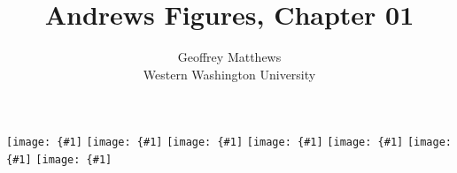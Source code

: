 \documentclass{article}
\title{Andrews Figures, Chapter 01}
\author{Geoffrey Matthews\\
\small Western Washington University}
\newcommand{\myfig}[1]{\hspace{-1.5in}\texttt{[image: \{\#1]}}\newpage}
\newcommand{\myfigbig}[1]
{\hspace{-1.0in}\texttt{[image: \{\#1]}}\newpage}
\begin{document}
\maketitle

\myfig{chap06/6_1.pdf}
\myfigbig{chap06/6_2.pdf}
\myfig{chap06/6_3.pdf}
\myfigbig{chap06/6_4.pdf}
\myfig{chap06/6_5.pdf}
\myfig{chap06/6_6.pdf}
\myfig{chap06/6_7.pdf}
\end{document}
